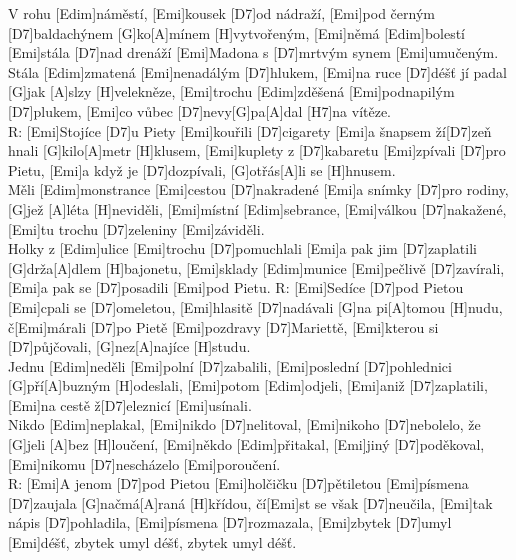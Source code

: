 \documentclass[10pt]{article}
\begin{document}
\begin{Large}
\begin{minipage}{\textwidth}
\begin{multicols}{2}
\begin{guitar}
	[Emi]V rohu [Edim]náměstí, [Emi]kousek [D7]od nádraží,
	[Emi]pod černým [D7]baldachýnem [G]ko[A]mínem 
	[H]vytvořeným,
	[Emi]němá [Edim]bolestí [Emi]stála [D7]nad drenáží
	[Emi]Madona s [D7]mrtvým synem [Emi]umučeným.
	\\
	[Emi]Stála [Edim]zmatená [Emi]nenadálým [D7]hlukem,
	[Emi]na ruce [D7]déšť jí padal [G]jak [A]slzy [H]velekněze,
	[Emi]trochu [Edim]zděšená [Emi]podnapilým [D7]plukem,
	[Emi]co vůbec [D7]nevy[G]pa[A]dal [H7]na vítěze.
	\\
	R: [Emi]Stojíce [D7]u Piety [Emi]kouřili [D7]cigarety
	[Emi]a šnapsem ží[D7]zeň hnali [G]kilo[A]metr [H]klusem,
	[Emi]kuplety z [D7]kabaretu [Emi]zpívali [D7]pro Pietu,
	[Emi]a když je [D7]dozpívali, [G]otřás[A]li se [H]hnusem.
	\\
	[Emi]Měli [Edim]monstrance [Emi]cestou [D7]nakradené
	[Emi]a snímky [D7]pro rodiny, [G]jež [A]léta [H]neviděli,
	[Emi]místní [Edim]sebrance, [Emi]válkou [D7]nakažené,
	[Emi]tu trochu [D7]zeleniny [Emi]záviděli.
	\\
	[Emi]Holky z [Edim]ulice [Emi]trochu [D7]pomuchlali
	[Emi]a pak jim [D7]zaplatili [G]drža[A]dlem [H]bajonetu,
	[Emi]sklady [Edim]munice [Emi]pečlivě [D7]zavírali,
	[Emi]a pak se [D7]posadili [Emi]pod Pietu.
	\columnbreak
	R: [Emi]Sedíce [D7]pod Pietou [Emi]cpali se [D7]omeletou,
	[Emi]hlasitě [D7]nadávali [G]na pi[A]tomou [H]nudu,
	č[Emi]márali [D7]po Pietě [Emi]pozdravy [D7]Mariettě,
	[Emi]kterou si [D7]půjčovali, [G]nez[A]najíce [H]studu.
	\\
	[Emi]Jednu [Edim]neděli [Emi]polní [D7]zabalili,
	[Emi]poslední [D7]pohlednici [G]pří[A]buzným [H]odeslali,
	[Emi]potom [Edim]odjeli, [Emi]aniž [D7]zaplatili,
	[Emi]na cestě ž[D7]eleznicí [Emi]usínali.
	\\
	[Emi]Nikdo [Edim]neplakal, [Emi]nikdo [D7]nelitoval,
	[Emi]nikoho [D7]nebolelo, že [G]jeli [A]bez [H]loučení,
	[Emi]někdo [Edim]přitakal, [Emi]jiný [D7]poděkoval,
	[Emi]nikomu [D7]nescházelo [Emi]poroučení.
	\\
	R: [Emi]A jenom [D7]pod Pietou [Emi]holčičku [D7]pětiletou
	[Emi]písmena [D7]zaujala [G]načmá[A]raná [H]křídou,
	čí[Emi]st se však [D7]neučila, [Emi]tak nápis [D7]pohladila,
	[Emi]písmena [D7]rozmazala, [Emi]zbytek [D7]umyl [Emi]déšť,
	zbytek umyl déšť, zbytek umyl déšť.
\end{guitar}
\end{multicols}
\end{minipage}

\begin{minipage}{\textwidth}

\end{minipage}
\end{Large}
\end{document}
